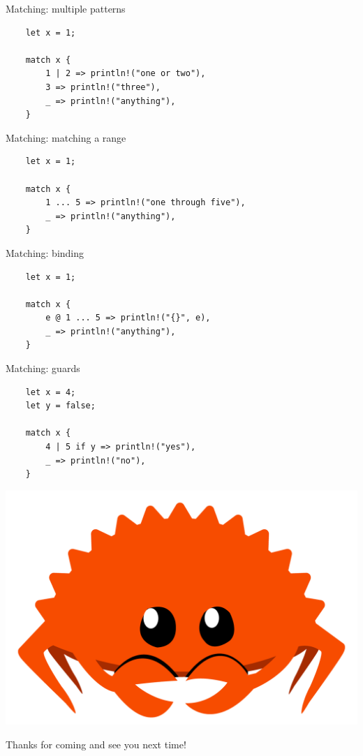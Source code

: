 \documentclass[12pt, aspectratio=169]{beamer}
\newcommand{\ferrisframe}[1]{%
  \begin{frame}[standout]
    \includegraphics[height=0.8\textheight]{images/ferris.png}

    #1
  \end{frame}
}
\begin{document}
\begin{frame}[fragile]{Matching: multiple patterns}
  \begin{verbatim}
    let x = 1;

    match x {
        1 | 2 => println!("one or two"),
        3 => println!("three"),
        _ => println!("anything"),
    }
  \end{verbatim}
\end{frame}

\begin{frame}[fragile]{Matching: matching a range}
  \begin{verbatim}
    let x = 1;

    match x {
        1 ... 5 => println!("one through five"),
        _ => println!("anything"),
    }
  \end{verbatim}
\end{frame}

\begin{frame}[fragile]{Matching: binding}
  \begin{verbatim}
    let x = 1;

    match x {
        e @ 1 ... 5 => println!("{}", e),
        _ => println!("anything"),
    }
  \end{verbatim}
\end{frame}

\begin{frame}[fragile]{Matching: guards}
  \begin{verbatim}
    let x = 4;
    let y = false;

    match x {
        4 | 5 if y => println!("yes"),
        _ => println!("no"),
    }
  \end{verbatim}
\end{frame}

\ferrisframe{Thanks for coming and see you next time!}
\end{document}
